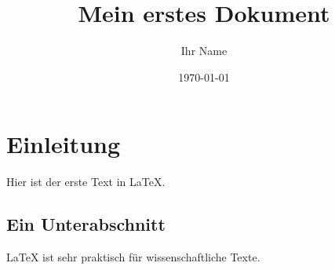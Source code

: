 \title{Mein erstes Dokument}
\author{Ihr Name}
\date{\today}



\maketitle %

\section{Einleitung}
Hier ist der erste Text in LaTeX.

\subsection{Ein Unterabschnitt}
\LaTeX{} ist sehr praktisch für wissenschaftliche Texte.